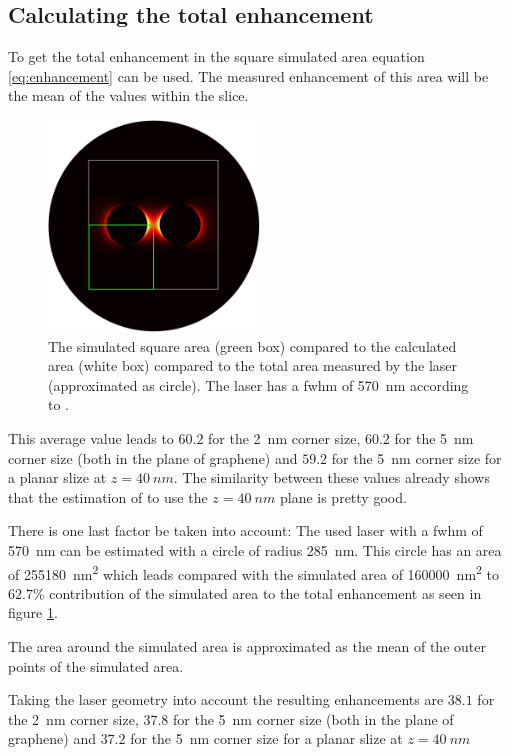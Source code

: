 \subsection{Calculating the total enhancement}

To get the total enhancement in the square simulated area equation \ref{eq:enhancement} can be used. The measured enhancement of this area will be the mean of the values within the slice.

\begin{figure}[!h]
  \centering
  \includegraphics[width=0.5\textwidth]{./images/fwhm-chart.jpg}
  \caption{The simulated square area (green box) compared to the calculated area (white box) compared to the total area measured by the laser (approximated as circle). The laser has a fwhm of \SI{570}{nm} according to \cite{heeg}.}
  \label{fig:symmetry}
\end{figure}

This average value leads to $60.2$ for the \SI{2}{nm} corner size, $60.2$ for the \SI{5}{nm} corner size (both in the plane of graphene) and $59.2$ for the \SI{5}{nm} corner size for a planar slize at $z=\SI{40}{nm}$. The similarity between these values already shows that the estimation of \cite{heeg} to use the $z=\SI{40}{nm}$ plane is pretty good.

There is one last factor be taken into account: The used laser with a fwhm of \SI{570}{nm} can be estimated with a circle of radius \SI{285}{nm}. This circle has an area of \SI{255 180}{nm^2} which leads compared with the simulated area of \SI{160 000}{nm^2} to $62.7\%$ contribution of the simulated area to the total enhancement as seen in figure \ref{fig:symmetry}.

The area around the simulated area is approximated as the mean of the outer points of the simulated area.

Taking the laser geometry into account the resulting enhancements are $38.1$ for the \SI{2}{nm} corner size, $37.8$ for the \SI{5}{nm} corner size (both in the plane of graphene) and $37.2$ for the \SI{5}{nm} corner size for a planar slize at $z=\SI{40}{nm}$

